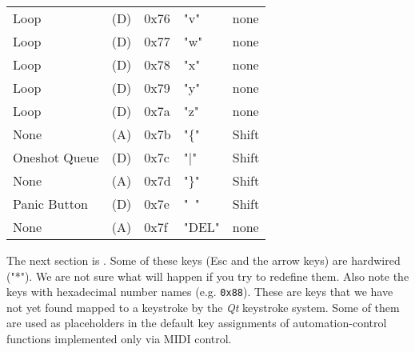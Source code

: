 \begin{table}[htb!]
\begin{tabular}{l l l l l}
        Loop               & (D)  &  0x76   & "v"          & none \\
        Loop               & (D)  &  0x77   & "w"          & none \\
        Loop               & (D)  &  0x78   & "x"          & none \\
        Loop               & (D)  &  0x79   & "y"          & none \\
        Loop               & (D)  &  0x7a   & "z"          & none \\
        None               & (A)  &  0x7b   & "\{"         & Shift \\
        Oneshot Queue      & (D)  &  0x7c   & "|"          & Shift \\
        None               & (A)  &  0x7d   & "\}"         & Shift \\
        Panic Button       & (D)  &  0x7e   & "~"          & Shift \\
        None               & (A)  &  0x7f   & "DEL"        & none \\
      \end{tabular}
   \end{table}

   The next section is .
   Some of these keys (Esc and the arrow keys) are
   hardwired ("*").
   We are not sure what will happen if you try to redefine them.
   Also note the keys with hexadecimal number names (e.g. \texttt{0x88}).
   These are keys that we have not yet found mapped to a keystroke
   by the \textsl{Qt} keystroke system.
   Some of them are used as placeholders in the default key assignments
   of automation-control functions implemented only via MIDI control.

